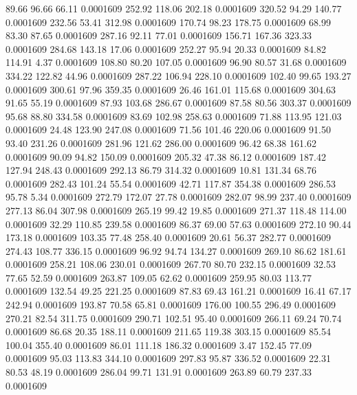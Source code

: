   89.66   96.66   66.11   0.0001609
 252.92  118.06  202.18   0.0001609
 320.52   94.29  140.77   0.0001609
 232.56   53.41  312.98   0.0001609
 170.74   98.23  178.75   0.0001609
  68.99   83.30   87.65   0.0001609
 287.16   92.11   77.01   0.0001609
 156.71  167.36  323.33   0.0001609
 284.68  143.18   17.06   0.0001609
 252.27   95.94   20.33   0.0001609
  84.82  114.91    4.37   0.0001609
 108.80   80.20  107.05   0.0001609
  96.90   80.57   31.68   0.0001609
 334.22  122.82   44.96   0.0001609
 287.22  106.94  228.10   0.0001609
 102.40   99.65  193.27   0.0001609
 300.61   97.96  359.35   0.0001609
  26.46  161.01  115.68   0.0001609
 304.63   91.65   55.19   0.0001609
  87.93  103.68  286.67   0.0001609
  87.58   80.56  303.37   0.0001609
  95.68   88.80  334.58   0.0001609
  83.69  102.98  258.63   0.0001609
  71.88  113.95  121.03   0.0001609
  24.48  123.90  247.08   0.0001609
  71.56  101.46  220.06   0.0001609
  91.50   93.40  231.26   0.0001609
 281.96  121.62  286.00   0.0001609
  96.42   68.38  161.62   0.0001609
  90.09   94.82  150.09   0.0001609
 205.32   47.38   86.12   0.0001609
 187.42  127.94  248.43   0.0001609
 292.13   86.79  314.32   0.0001609
  10.81  131.34   68.76   0.0001609
 282.43  101.24   55.54   0.0001609
  42.71  117.87  354.38   0.0001609
 286.53   95.78    5.34   0.0001609
 272.79  172.07   27.78   0.0001609
 282.07   98.99  237.40   0.0001609
 277.13   86.04  307.98   0.0001609
 265.19   99.42   19.85   0.0001609
 271.37  118.48  114.00   0.0001609
  32.29  110.85  239.58   0.0001609
  86.37   69.00   57.63   0.0001609
 272.10   90.44  173.18   0.0001609
 103.35   77.48  258.40   0.0001609
  20.61   56.37  282.77   0.0001609
 274.43  108.77  336.15   0.0001609
  96.92   94.74  134.27   0.0001609
 269.10   86.62  181.61   0.0001609
 258.21  108.06  230.01   0.0001609
 267.70   80.70  232.15   0.0001609
  32.53   77.65   52.59   0.0001609
 263.87  109.05   62.62   0.0001609
 259.95   80.03  113.77   0.0001609
 132.54   49.25  221.25   0.0001609
  87.83   69.43  161.21   0.0001609
  16.41   67.17  242.94   0.0001609
 193.87   70.58   65.81   0.0001609
 176.00  100.55  296.49   0.0001609
 270.21   82.54  311.75   0.0001609
 290.71  102.51   95.40   0.0001609
 266.11   69.24   70.74   0.0001609
  86.68   20.35  188.11   0.0001609
 211.65  119.38  303.15   0.0001609
  85.54  100.04  355.40   0.0001609
  86.01  111.18  186.32   0.0001609
   3.47  152.45   77.09   0.0001609
  95.03  113.83  344.10   0.0001609
 297.83   95.87  336.52   0.0001609
  22.31   80.53   48.19   0.0001609
 286.04   99.71  131.91   0.0001609
 263.89   60.79  237.33   0.0001609
